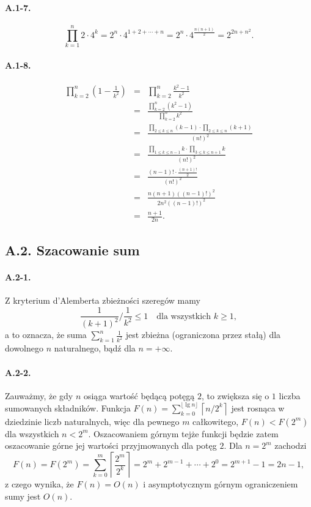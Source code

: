 \paragraph{A.1-7.}
\[
	\prod_{k=1}^n2\cdot 4^k = 2^n\cdot 4^{1+2+\cdots+n} = 2^n\cdot 4^{\frac{n(n+1)}{2}} = 2^{2n+n^2}.
\]

\paragraph{A.1-8.}
\begin{eqnarray*}
	\prod_{k=2}^n\left(1-\frac{1}{k^2}\right) &=& \prod_{k=2}^n\frac{k^2-1}{k^2} \\
	&=& \frac{\prod_{k=2}^n\left(k^2-1\right)}{\prod_{k=2}^nk^2} \\
	&=& \frac{\prod_{2\le k\le n}(k-1)\cdot\prod_{2\le k\le n}(k+1)}{(n!)^2} \\
	&=& \frac{\prod_{1\le k\le n-1}k\cdot\prod_{3\le k\le n+1}k}{(n!)^2} \\
	&=& \frac{(n-1)!\cdot\frac{(n+1)!}{2}}{(n!)^2} \\
	&=& \frac{n(n+1)((n-1)!)^2}{2n^2((n-1)!)^2} \\
	&=& \frac{n+1}{2n}.
\end{eqnarray*}

\subsection*{A.2. Szacowanie sum}

\paragraph{A.2-1.}
Z kryterium d'Alemberta zbieżności szeregów mamy
\[
	\frac{1}{(k+1)^2}\bigg /\frac{1}{k^2}\le 1\quad\mbox{dla wszystkich }k\ge1,
\]
a to oznacza, że suma $\sum_{k=1}^n\frac{1}{k^2}$ jest zbieżna (ograniczona przez stałą) dla dowolnego $n$ naturalnego, bądź dla $n=+\infty$.

\paragraph{A.2-2.}
Zauważmy, że gdy $n$ osiąga wartość będącą potęgą $2$, to zwiększa się o $1$ liczba sumowanych składników. Funkcja $F(n)=\sum_{k=0}^{\lfloor\lg n\rfloor}\left\lceil n/2^k\right\rceil$ jest rosnąca w dziedzinie liczb naturalnych, więc dla pewnego $m$ całkowitego, $F(n)<F(2^m)$ dla wszystkich $n<2^m$. Oszacowaniem górnym tejże funkcji będzie zatem oszacowanie górne jej wartości przyjmowanych dla potęg $2$. Dla $n=2^m$ zachodzi
\[
	F(n) = F(2^m) = \sum_{k=0}^m\left\lceil\frac{2^m}{2^k}\right\rceil = 2^m+2^{m-1}+\cdots+2^0 = 2^{m+1}-1 = 2n-1,
\]
z czego wynika, że $F(n) = O(n)$ i asymptotycznym górnym ograniczeniem sumy jest $O(n)$.


